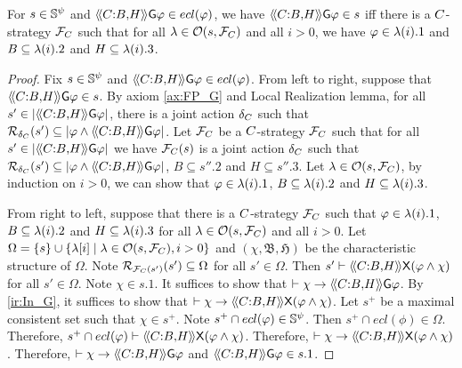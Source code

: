 \begin{theorem}
For $s\in \mathbb{S}^\psi $ and $\langle\!\langle C{:}B{,}H  \rangle\!\rangle\mathsf{G} \varphi \in ecl(\varphi)$, we have $\langle\!\langle C{:}B{,}H  \rangle\!\rangle\mathsf{G} \varphi\in s$ iff there is a $C$-strategy $\mathcal{F}_C $ such that for all $\lambda \in \mathcal{O}(s,\mathcal{F}_C)$ and all $i>0$, we have $\varphi \in \lambda(i).1$ and $B\subseteq \lambda(i).2$ and $H\subseteq \lambda(i).3$.
\end{theorem}
\begin{proof}
 Fix $s\in \mathbb{S}^\psi $ and $\langle\!\langle C{:}B{,}H  \rangle\!\rangle\mathsf{G} \varphi \in ecl(\varphi)$. From left to right, suppose that $\langle\!\langle C{:}B{,}H  \rangle\!\rangle\mathsf{G} \varphi\in s$. By axiom \ref{ax:FP_G} and Local Realization lemma, for all $s'\in |\langle\!\langle C{:}B{,}H  \rangle\!\rangle\mathsf{G} \varphi |$, there is a joint action $\delta_{C}$ such that $\mathcal{R}_{\delta_{C}}(s')\subseteq |\varphi \wedge \langle\!\langle C{:}B{,}H  \rangle\!\rangle\mathsf{G} \varphi |$. Let $\mathcal{F}_C $ be a $C$-strategy $\mathcal{F}_C$ such that for all $s'\in |\langle\!\langle C{:}B{,}H  \rangle\!\rangle\mathsf{G} \varphi |$ we have $\mathcal{F}_C(s)$ is a joint action $\delta_{C}$ such that $\mathcal{R}_{\delta_{C}}(s')\subseteq |\varphi \wedge \langle\!\langle C{:}B{,}H  \rangle\!\rangle\mathsf{G} \varphi |$, $B\subseteq s''.2$ and $H\subseteq s''.3$. Let $\lambda \in \mathcal{O}(s,\mathcal{F}_C)$, by induction on $i>0$, we can show that $\varphi \in \lambda(i).1$, $B\subseteq \lambda(i).2$ and $H\subseteq \lambda(i).3$. 

 From right to left, suppose that there is a $C$-strategy $\mathcal{F}_C $ such that $\varphi \in \lambda(i).1$, $B\subseteq \lambda(i).2$ and $H\subseteq \lambda(i).3$ for all $\lambda \in \mathcal{O}(s,\mathcal{F}_C)$ and all $i>0$. 
 Let $\Omega = \{s\}\cup \{\lambda[i]\mid \lambda \in \mathcal{O}(s,\mathcal{F}_C), i>0\}$ and $(\chi ,\mathfrak{B},\mathfrak{H})$ be the characteristic structure of $\Omega$. 
 Note $\mathcal{R}_{\mathcal{F}_C(s')}(s')\subseteq \Omega$ for all $s'\in \Omega $. Then $s'\vdash \langle\!\langle C{:}B{,}H  \rangle\!\rangle\mathsf{X} (\varphi \wedge \chi )$ for all $s'\in \Omega $. 
 Note $\chi \in s.1$. It suffices to show that $\vdash \chi \rightarrow \langle\!\langle C{:}B{,}H  \rangle\!\rangle\mathsf{G} \varphi $. 
 By \ref{ir:In_G}, 
 it suffices to show that $\vdash \chi \rightarrow \langle\!\langle C{:}B{,}H  \rangle\!\rangle\mathsf{X}(\varphi \wedge \chi)$. 
 Let $s^+$ be a maximal consistent set such that $\chi \in s^+$. Note $s^+\cap ecl(\varphi )\in \mathbb{S}^\psi $. Then $s^+\cap ecl(\phi )\in \Omega$. 
 Therefore, $s^+\cap ecl(\varphi )\vdash \langle\!\langle C{:}B{,}H  \rangle\!\rangle\mathsf{X} (\varphi \wedge \chi )$. Therefore, $\vdash \chi \rightarrow \langle\!\langle C{:}B{,}H  \rangle\!\rangle\mathsf{X}(\varphi \wedge \chi)$. Therefore, $\vdash \chi \rightarrow \langle\!\langle C{:}B{,}H  \rangle\!\rangle\mathsf{G} \varphi $ and $\langle\!\langle C{:}B{,}H  \rangle\!\rangle\mathsf{G} \varphi\in s.1$.
\end{proof}

